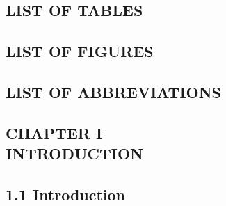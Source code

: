 \documentclass[12pt]{report}
\begin{document}
\newpage
\tableofcontents

\clearpage %
\begin{center}
\section*{LIST OF TABLES}
\end{center}
\renewcommand{\thepage}{\roman{page}}
\setcounter{page}{6}


\vspace{2cm}


\newpage %
\begin{center}
\section*{LIST OF FIGURES}
\end{center}
\renewcommand{\thepage}{\roman{page}}
\setcounter{page}{7}


\vspace{2cm}

\newpage %
\begin{center}
\section*{LIST OF ABBREVIATIONS}
\end{center}
\renewcommand{\thepage}{\roman{page}}
\setcounter{page}{8}


\vspace{2cm}


\clearpage %
\begin{center}
\section*{CHAPTER I \\ INTRODUCTION}
\end{center}
\renewcommand{\thepage}{\arabic{page}}



\vspace{2cm}


\subsection*{1.1 Introduction}
\renewcommand{\thepage}{\arabic{page}}
\end{document}
